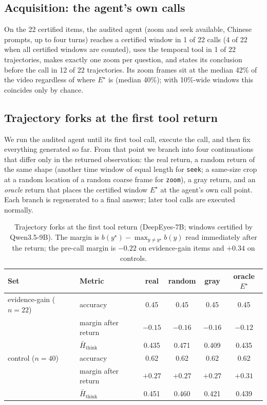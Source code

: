 \documentclass{article}
\newcommand{\estar}{E^{\star}}
\begin{document}
\subsection{Acquisition: the agent's own calls}
On the 22 certified items, the audited agent (zoom and seek available, Chinese prompts, up to four turns) reaches a certified window in 1 of 22 calls (4 of 22 when all certified windows are counted), uses the temporal tool in 1 of 22 trajectories, makes exactly one zoom per question, and states its conclusion before the call in 12 of 22 trajectories. Its zoom frames sit at the median 42\% of the video regardless of where $\estar$ is (median 40\%); with 10\%-wide windows this coincides only by chance.

\subsection{Trajectory forks at the first tool return}
\label{sec:fork}
We run the audited agent until its first tool call, execute the call, and then fix everything generated so far. From that point we branch into four continuations that differ only in the returned observation: the real return, a random return of the same shape (another time window of equal length for \texttt{seek}; a same-size crop at a random location of a random coarse frame for \texttt{zoom}), a gray return, and an \emph{oracle} return that places the certified window $\estar$ at the agent's own call point. Each branch is regenerated to a final answer; later tool calls are executed normally.

\begin{table}[t]
\centering
\small
\begin{tabular}{llcccc}
\toprule
Set & Metric & real & random & gray & oracle $\estar$\\
\midrule
evidence-gain ($n{=}22$) & accuracy & 0.45 & 0.45 & 0.45 & 0.45\\
 & margin after return & $-0.15$ & $-0.16$ & $-0.16$ & $-0.12$\\
 & $\bar H_{\mathrm{think}}$ & 0.435 & 0.471 & 0.409 & 0.435\\
control ($n{=}40$) & accuracy & 0.62 & 0.62 & 0.62 & 0.62\\
 & margin after return & $+0.27$ & $+0.27$ & $+0.27$ & $+0.31$\\
 & $\bar H_{\mathrm{think}}$ & 0.451 & 0.460 & 0.421 & 0.439\\
\bottomrule
\end{tabular}
\caption{Trajectory forks at the first tool return (DeepEyes-7B; windows certified by Qwen3.5-9B). The margin is $b(y^\star)-\max_{y\ne y^\star}b(y)$ read immediately after the return; the pre-call margin is $-0.22$ on evidence-gain items and $+0.34$ on controls.}
\label{tab:fork}
\end{table}
\end{document}
